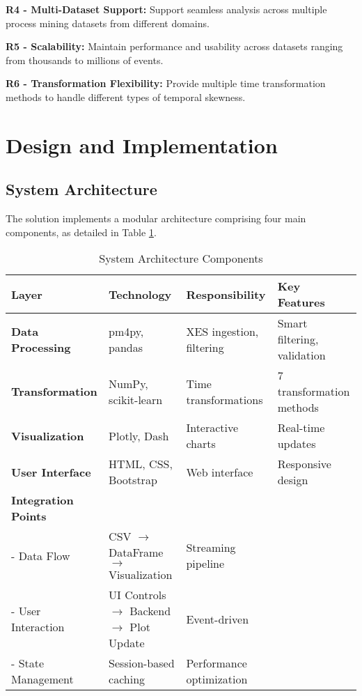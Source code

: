 \documentclass[11pt,a4paper]{article}
\begin{document}
\textbf{R4 - Multi-Dataset Support:} Support seamless analysis across multiple process mining datasets from different domains.

\textbf{R5 - Scalability:} Maintain performance and usability across datasets ranging from thousands to millions of events.

\textbf{R6 - Transformation Flexibility:} Provide multiple time transformation methods to handle different types of temporal skewness.

\section{Design and Implementation}
\label{sec:design}

\subsection{System Architecture}

The solution implements a modular architecture comprising four main components, as detailed in Table \ref{tab:architecture}.

\begin{table}[H]
\centering
\caption{System Architecture Components}
\label{tab:architecture}
\begin{tabular}{@{}llll@{}}
\toprule
\textbf{Layer} & \textbf{Technology} & \textbf{Responsibility} & \textbf{Key Features} \\
\midrule
\textbf{Data Processing} & pm4py, pandas & XES ingestion, filtering & Smart filtering, validation \\
\textbf{Transformation} & NumPy, scikit-learn & Time transformations & 7 transformation methods \\
\textbf{Visualization} & Plotly, Dash & Interactive charts & Real-time updates \\
\textbf{User Interface} & HTML, CSS, Bootstrap & Web interface & Responsive design \\
\midrule
\textbf{Integration Points} & & & \\
- Data Flow & CSV $\rightarrow$ DataFrame $\rightarrow$ Visualization & Streaming pipeline \\
- User Interaction & UI Controls $\rightarrow$ Backend $\rightarrow$ Plot Update & Event-driven \\
- State Management & Session-based caching & Performance optimization \\
\bottomrule
\end{tabular}
\end{table}
\end{document}
